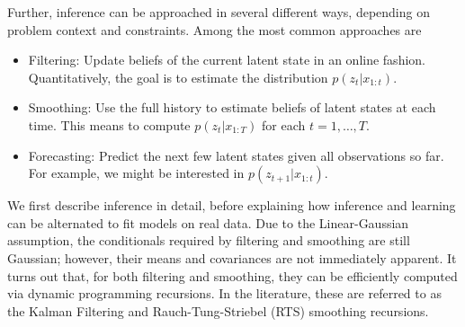 \documentclass[14pt]{extarticle}
\begin{document}
Further, inference can be approached in several different ways, depending on
problem context and constraints. Among the most common approaches are
\begin{itemize}
\item Filtering: Update beliefs of the current latent state in an online
  fashion. Quantitatively, the goal is to estimate the distribution
  $p\left(z_{t} \vert x_{1:t}\right)$.
\item Smoothing: Use the full history to estimate beliefs of latent states at
  each time. This means to compute $p\left(z_{t} \vert x_{1:T}\right)$ for each
  $t = 1, \dots, T$.
\item Forecasting: Predict the next few latent states given all observations so
  far. For example, we might be interested in $p\left(z_{t + 1} \vert
  x_{1:t}\right)$.
\end{itemize}

\begin{figure}
  \centering
  \caption{\label{fig:lds_graphical} }
\end{figure}

We first describe inference in detail, before explaining how inference and
learning can be alternated to fit models on real data. Due to the
Linear-Gaussian assumption, the conditionals required by filtering and smoothing
are still Gaussian; however, their means and covariances are not immediately
apparent. It turns out that, for both filtering and smoothing, they can be
efficiently computed via dynamic programming recursions. In the literature,
these are referred to as the Kalman Filtering and Rauch-Tung-Striebel (RTS)
smoothing recursions.
\end{document}
